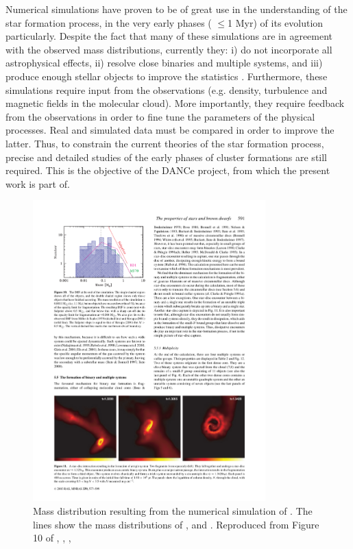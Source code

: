 Numerical simulations have proven to be of great use in the understanding of the star formation process, in the very early phases ( $\leq$1 Myr) of its evolution particularly.  Despite the fact that many of these simulations are in agreement with the observed mass distributions, currently they: i) do not incorporate all astrophysical effects, ii) resolve close binaries and multiple systems, and iii) produce enough stellar objects to improve the statistics \citep{Offner2014}. Furthermore, these simulations require input from the observations (e.g. density, turbulence and magnetic fields in the molecular cloud). More importantly, they require feedback from the observations in order to fine tune the parameters of the physical processes. Real and simulated data must be compared in order to improve the latter. Thus, to constrain the current theories of the star formation process, precise and detailed studies of the early phases of cluster formations are still required. This is the objective of the DANCe project, from which the present work is part of.


\begin{figure}[ht!]
\begin{center}
\includegraphics[width=0.8\textwidth]{background/Figures/F10_Bate2003.pdf}
\caption{Mass distribution resulting from the numerical simulation of \citet{2003MNRAS.339..577B}. The lines show the mass distributions of \citet{Salpeter1955}, \citet{1979ApJS...41..513M} and \citet{2001MNRAS.322..231K}. Reproduced from Figure 10 of \citet{2003MNRAS.339..577B}, \textit{}, , }
\label{fig:IMFBate2003}
\end{center}
\end{figure}


